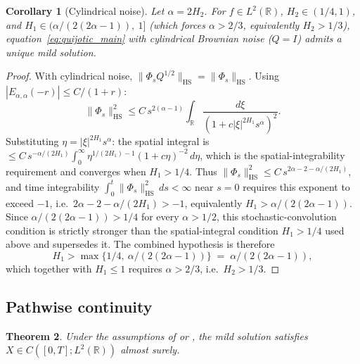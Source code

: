 \documentclass[11pt]{article}
\newtheorem{theorem}{Theorem}[section]
\newtheorem{corollary}[theorem]{Corollary}
\theoremstyle{definition}
\theoremstyle{remark}
\newcommand{\R}{\mathbb{R}}
\newcommand{\norm}[1]{\| #1 \|}
\begin{document}
\begin{corollary}[Cylindrical noise]
\label{thm:existence}
Let $\alpha = 2H_2$.  For $f \in L^2(\R)$,
$H_2 \in (1/4,1)$, and
$H_1 \in (\alpha/(2(2\alpha-1)),\ 1]$
(which forces $\alpha > 2/3$, equivalently
$H_2 > 1/3$), equation~\eqref{eq:quijotic_main}
with cylindrical Brownian noise ($Q = I$) admits a
unique mild solution.
\end{corollary}

\begin{proof}
With cylindrical noise, $\norm{\Phi_s Q^{1/2}}_{\mathrm{HS}}
= \norm{\Phi_s}_{\mathrm{HS}}$.  Using
$|E_{\alpha,\alpha}(-r)| \leq C/(1+r)$:
\[
\norm{\Phi_s}_{\mathrm{HS}}^2
\leq C\,s^{2(\alpha-1)} \int_\R
\frac{d\xi}{(1 + c|\xi|^{2H_1} s^\alpha)^2}.
\]
Substituting $\eta = |\xi|^{2H_1} s^\alpha$:
the spatial integral is
$\leq C\,s^{-\alpha/(2H_1)}
\int_0^\infty \eta^{1/(2H_1)-1}(1+c\eta)^{-2}\, d\eta$,
which is the spatial-integrability requirement and
converges when $H_1 > 1/4$.  Thus
$\norm{\Phi_s}_{\mathrm{HS}}^2
\leq C\,s^{2\alpha - 2 - \alpha/(2H_1)}$, and time
integrability $\int_0^t \norm{\Phi_s}_{\mathrm{HS}}^2\,
ds < \infty$ near $s = 0$ requires this exponent to
exceed $-1$, i.e.\ $2\alpha - 2 - \alpha/(2H_1) > -1$,
equivalently $H_1 > \alpha/(2(2\alpha - 1))$.  Since
$\alpha/(2(2\alpha - 1)) > 1/4$ for every
$\alpha > 1/2$, this stochastic-convolution condition
is strictly stronger than the spatial-integral
condition $H_1 > 1/4$ used above and supersedes it.
The combined hypothesis is therefore
\[
H_1 > \max\bigl\{1/4,\ \alpha/(2(2\alpha-1))\bigr\}
\;=\; \alpha/(2(2\alpha-1)),
\]
which together with $H_1 \leq 1$ requires
$\alpha > 2/3$, i.e.\ $H_2 > 1/3$.
\end{proof}

\subsection{Pathwise continuity}

\begin{theorem}\label{thm:continuity}
Under the assumptions of 
or , the mild solution satisfies
$X \in C([0,T]; L^2(\R))$ almost surely.
\end{theorem}
\end{document}
